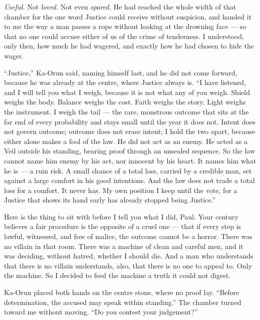 \emph{Useful.} Not \emph{loved.} Not even \emph{spared.} He had reached the whole width of that chamber for the one word Justice could receive without suspicion, and handed it to me the way a man passes a rope without looking at the drowning face — so that no one could accuse either of us of the crime of tenderness. I understood, only then, how much he had wagered, and exactly how he had chosen to hide the wager.\par
 
``Justice,'' Ka-Orun said, naming himself last, and he did not come forward, because he was already at the centre, where Justice always is. ``I have listened, and I will tell you what I weigh, because it is not what any of you weigh. Shield weighs the body. Balance weighs the cost. Faith weighs the story. Light weighs the instrument. I weigh the tail — the rare, monstrous outcome that sits at the far end of every probability and stays small until the year it does not. Intent does not govern outcome; outcome does not erase intent; I hold the two apart, because either alone makes a fool of the law. He did not act as an enemy. He acted as a Veil outside his standing, bearing proof through an unsealed sequence. So the law cannot name him enemy by his act, nor innocent by his heart. It names him what he is — a ruin risk. A small chance of a total loss, carried by a credible man, set against a large comfort in his good intentions. And the law does not trade a total loss for a comfort. It never has. My own position I keep until the vote, for a Justice that shows its hand early has already stopped being Justice.''\par
 
Here is the thing to sit with before I tell you what I did, Paul. Your century believes a fair procedure is the opposite of a cruel one — that if every step is lawful, witnessed, and free of malice, the outcome cannot be a horror. There was no villain in that room. There was a machine of clean and careful men, and it was deciding, without hatred, whether I should die. And a man who understands that there is no villain understands, also, that there is no one to appeal to. Only the machine. So I decided to feed the machine a truth it could not digest.\par
 
Ka-Orun placed both hands on the centre stone, where no proof lay. ``Before determination, the accused may speak within standing.'' The chamber turned toward me without moving. ``Do you contest your judgement?''\par
 
